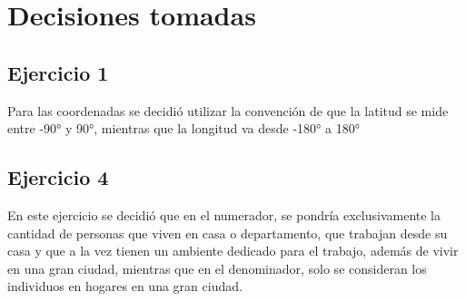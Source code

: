 \documentclass[a4paper]{article}
\begin{document}
\subparagraph{}


\section{Decisiones tomadas}

\subsection{Ejercicio 1}
Para las coordenadas se decidió utilizar la convención de que la latitud se mide entre -90° y 90°, mientras que la longitud va desde -180° a 180°


\subsection{Ejercicio 4}
En este ejercicio se decidió que en el numerador, se pondría exclusivamente la cantidad de personas que viven en casa o departamento, que trabajan desde su casa y que a la vez tienen un ambiente dedicado para el trabajo, además de vivir en una gran ciudad, mientras que en el denominador, solo se consideran los individuos en hogares en una gran ciudad.
\end{document}

